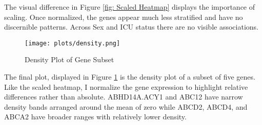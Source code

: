 \documentclass{article}
\begin{document}
The visual difference in Figure \ref{fig: Scaled Heatmap} displays the importance of scaling. Once normalized, the genes appear much less stratified and have no discernible patterns. Across Sex and ICU status there are no visible associations.

\begin{figure}[h!]
    \centering
    \texttt{[image: plots/density.png]}
    \caption{Density Plot of Gene Subset}
    \label{fig: Density}
\end{figure}

The final plot, displayed in Figure \ref{fig: Density} is the density plot of a subset of five genes. Like the scaled heatmap, I normalize the gene expression to highlight relative differences rather than absolute. ABHD14A.ACY1 and ABC12 have narrow density bands arranged around the mean of zero while ABCD2, ABCD4, and ABCA2 have broader ranges with relatively lower density. 


\FloatBarrier
\newpage


\end{document}
